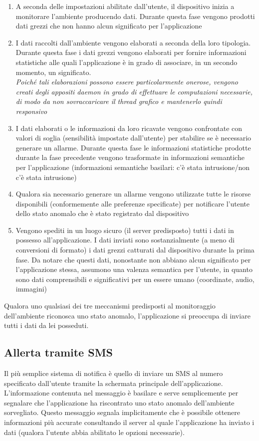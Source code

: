 \begin{enumerate}
  \item A seconda delle impostazioni abilitate dall'utente, il dispositivo inizia a monitorare l'ambiente producendo dati. Durante questa fase vengono prodotti dati grezzi che non hanno alcun significato per l'applicazione
  \item I dati raccolti dall'ambiente vengono elaborati a seconda della loro tipologia. Durante questa fase i dati grezzi vengono elaborati per fornire informazioni statistiche alle quali l'applicazione è in grado di associare, in un secondo momento, un significato.\\
  \textit{Poiché tali elaborazioni possono essere particolarmente onerose, vengono creati degli appositi daemon in grado di effettuare le computazioni necessarie, di modo da non sovraccaricare il thread grafico e mantenerlo quindi responsivo}
  \item I dati elaborati o le informazioni da loro ricavate vengono confrontate con valori di soglia (sensibilità impostate dall'utente) per stabilire se è necessario generare un allarme. Durante questa fase le informazioni statistiche prodotte durante la fase precedente vengono trasformate in informazioni semantiche per l'applicazione (informazioni semantiche basilari: c'è stata intrusione/non c'è stata intrusione)
  \item Qualora sia necessario generare un allarme vengono utilizzate tutte le risorse disponibili (conformemente alle preferenze specificate) per notificare l'utente dello stato anomalo che è stato registrato dal dispositivo
  \item Vengono spediti in un luogo sicuro (il server predisposto) tutti i dati in possesso all'applicazione. I dati inviati sono sostanzialmente (a meno di conversioni di formato) i dati grezzi catturati dal dispositivo durante la prima fase. Da notare che questi dati, nonostante non abbiano alcun significato per l'applicazione stessa, assumono una valenza semantica per l'utente, in quanto sono dati comprensibili e significativi per un essere umano (coordinate, audio, immagini)
\end{enumerate}
Qualora uno qualsiasi dei tre meccanismi predisposti al monitoraggio dell'ambiente riconosca uno stato anomalo, l'applicazione si preoccupa di inviare tutti i dati da lei posseduti.

\subsection{Allerta tramite SMS}
Il più semplice sistema di notifica è quello di inviare un SMS al numero specificato dall'utente tramite la schermata principale dell'applicazione.\\
L'informazione contenuta nel messaggio è basilare e serve semplicemente per segnalare che l'applicazione ha riscontrato uno stato anomalo dell'ambiente sorvegliato. Questo messaggio segnala implicitamente che è possibile ottenere informazioni più accurate consultando il server al quale l'applicazione ha inviato i dati (qualora l'utente abbia abilitato le opzioni necessarie).


